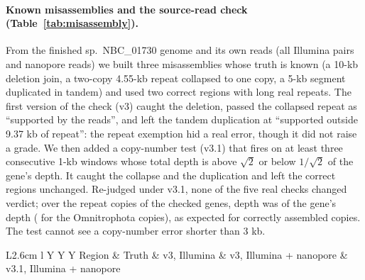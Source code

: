 \documentclass[11pt]{article}
\begin{document}
\paragraph{Known misassemblies and the source-read check (Table~\ref{tab:misassembly}).} From the finished 
sp.\ NBC\_01730 genome and its own reads (all  Illumina pairs and 
nanopore reads) we built three misassemblies whose truth is known (a 10-kb deletion join, a two-copy 4.55-kb repeat collapsed
to one copy, a 5-kb segment duplicated in tandem) and used two correct regions with long real repeats. The first version of
the check (v3) caught the deletion, passed the collapsed repeat as ``supported by the reads'', and left the tandem
duplication at ``supported outside 9.37 kb of repeat'': the repeat exemption hid a real error, though it did not raise a
grade. We then added a copy-number test (v3.1) that fires on at least three consecutive 1-kb windows whose total depth is
above $\sqrt{2}$ or below $1/\sqrt{2}$ of the gene's depth. It caught the collapse and the duplication and left the correct
regions unchanged. Re-judged under v3.1, none of the five real checks changed verdict; over the repeat copies of the checked
genes, depth was  of the gene's depth ( for the
Omnitrophota copies), as expected for correctly assembled copies. The test cannot see a copy-number error shorter than 3 kb.

\begin{table}[ht]
\centering\scriptsize
\caption{The source-read check on known misassemblies and correct repeat regions of the finished  sp.\
NBC\_01730 genome, checked with the genome's own reads. v3.1 adds the copy-number test.}\label{tab:misassembly}
\begin{tabularx}{\textwidth}{L{2.6cm} l Y Y Y}
\toprule
Region & Truth & v3, Illumina & v3, Illumina + nanopore & v3.1, Illumina + nanopore \\
\midrule
{}
\bottomrule
\end{tabularx}
\end{table}
\end{document}
